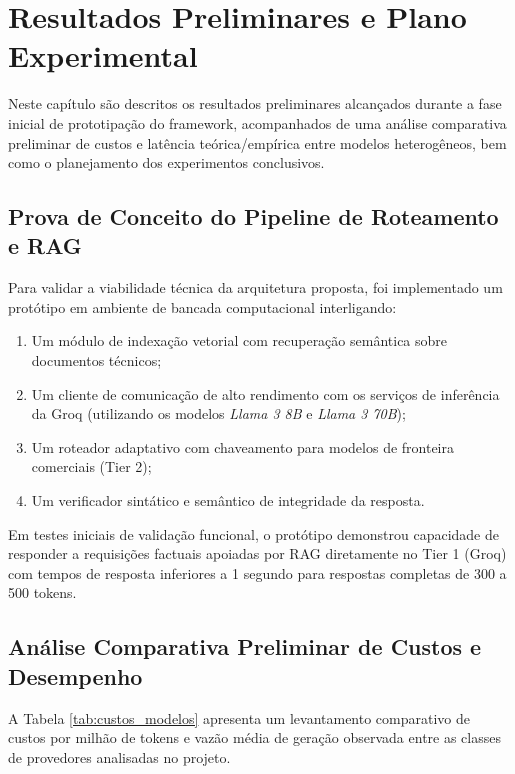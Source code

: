 \chapter{Resultados Preliminares e Plano Experimental}\label{resultados_preliminares}

Neste capítulo são descritos os resultados preliminares alcançados durante a fase inicial de prototipação do framework, acompanhados de uma análise comparativa preliminar de custos e latência teórica/empírica entre modelos heterogêneos, bem como o planejamento dos experimentos conclusivos.

\section{Prova de Conceito do Pipeline de Roteamento e RAG}

Para validar a viabilidade técnica da arquitetura proposta, foi implementado um protótipo em ambiente de bancada computacional interligando:
\begin{enumerate}
    \item Um módulo de indexação vetorial com recuperação semântica sobre documentos técnicos;
    \item Um cliente de comunicação de alto rendimento com os serviços de inferência da Groq (utilizando os modelos \textit{Llama 3 8B} e \textit{Llama 3 70B});
    \item Um roteador adaptativo com chaveamento para modelos de fronteira comerciais (Tier 2);
    \item Um verificador sintático e semântico de integridade da resposta.
\end{enumerate}

Em testes iniciais de validação funcional, o protótipo demonstrou capacidade de responder a requisições factuais apoiadas por RAG diretamente no Tier 1 (Groq) com tempos de resposta inferiores a 1 segundo para respostas completas de 300 a 500 tokens.

\section{Análise Comparativa Preliminar de Custos e Desempenho}

A Tabela \ref{tab:custos_modelos} apresenta um levantamento comparativo de custos por milhão de tokens e vazão média de geração observada entre as classes de provedores analisadas no projeto.

